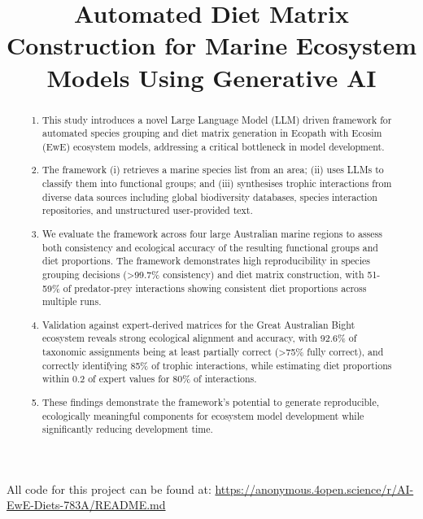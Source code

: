 \documentclass[12pt,a4paper]{article}
\title{Automated Diet Matrix Construction for Marine Ecosystem Models Using Generative AI}
\date{}  %
\begin{document}
\linenumbers
\maketitle

\begin{abstract}
\begin{enumerate}
\item This study introduces a novel Large Language Model (LLM) driven framework for automated species grouping and diet matrix generation in Ecopath with Ecosim (EwE) ecosystem models, addressing a critical bottleneck in model development.

\item The framework (i) retrieves a marine species list from an area; (ii) uses LLMs to classify them into functional groups; and (iii) synthesises trophic interactions from diverse data sources including global biodiversity databases, species interaction repositories, and unstructured user-provided text.

\item We evaluate the framework across four large Australian marine regions to assess both consistency and ecological accuracy of the resulting functional groups and diet proportions. The framework demonstrates high reproducibility in species grouping decisions (>99.7\% consistency) and diet matrix construction, with 51-59\% of predator-prey interactions showing consistent diet proportions across multiple runs.

\item Validation against expert-derived matrices for the Great Australian Bight ecosystem reveals strong ecological alignment and accuracy, with 92.6\% of taxonomic assignments being at least partially correct (>75\% fully correct), and correctly identifying 85\% of trophic interactions, while estimating diet proportions within 0.2 of expert values for 80\% of interactions.

\item These findings demonstrate the framework's potential to generate reproducible, ecologically meaningful components for ecosystem model development while significantly reducing development time.
\end{enumerate}
\end{abstract}

All code for this project can be found at: \url{https://anonymous.4open.science/r/AI-EwE-Diets-783A/README.md}








\clearpage

\end{document}
